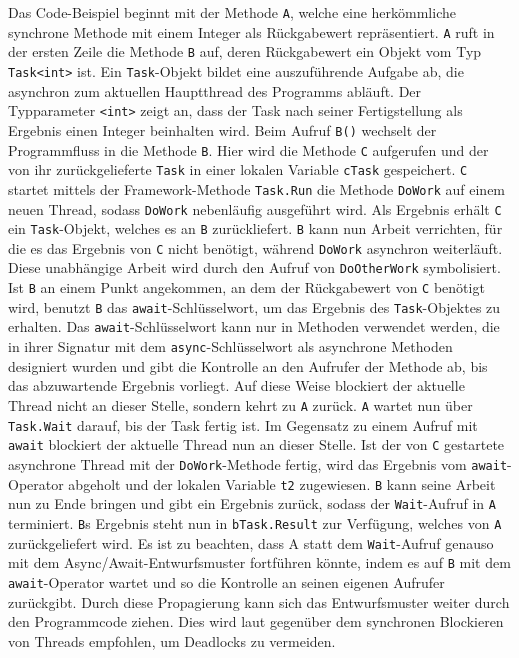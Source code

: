 \noindent
Das Code-Beispiel beginnt mit der Methode \texttt{A}, welche eine herkömmliche synchrone Methode mit einem Integer als Rückgabewert repräsentiert. \texttt{A} ruft in der ersten Zeile die Methode \texttt{B} auf, deren Rückgabewert ein Objekt vom Typ \texttt{Task<int>} ist. Ein \texttt{Task}-Objekt bildet eine auszuführende Aufgabe ab, die asynchron zum aktuellen Hauptthread des Programms abläuft. Der Typparameter \texttt{<int>} zeigt an, dass der Task nach seiner Fertigstellung als Ergebnis einen Integer beinhalten wird. Beim Aufruf \texttt{B()} wechselt der Programmfluss in die Methode \texttt{B}. Hier wird die Methode \texttt{C} aufgerufen und der von ihr zurückgelieferte \texttt{Task} in einer lokalen Variable \texttt{cTask} gespeichert. \texttt{C} startet mittels der Framework-Methode \texttt{Task.Run} die Methode \texttt{DoWork} auf einem neuen Thread, sodass \texttt{DoWork} nebenläufig ausgeführt wird. Als Ergebnis erhält \texttt{C} ein \texttt{Task}-Objekt, welches es an \texttt{B} zurückliefert. \texttt{B} kann nun Arbeit verrichten, für die es das Ergebnis von \texttt{C} nicht benötigt, während \texttt{DoWork} asynchron weiterläuft. Diese unabhängige Arbeit wird durch den Aufruf von \texttt{DoOtherWork} symbolisiert. Ist \texttt{B} an einem Punkt angekommen, an dem der Rückgabewert von \texttt{C} benötigt wird, benutzt \texttt{B} das \texttt{await}-Schlüsselwort, um das Ergebnis des \texttt{Task}-Objektes zu erhalten. Das \texttt{await}-Schlüsselwort kann nur in Methoden verwendet werden, die in ihrer Signatur mit dem \texttt{async}-Schlüsselwort als asynchrone Methoden designiert wurden und gibt die Kontrolle an den Aufrufer der Methode ab, bis das abzuwartende Ergebnis vorliegt. Auf diese Weise blockiert der aktuelle Thread nicht an dieser Stelle, sondern kehrt zu \texttt{A} zurück. \texttt{A} wartet nun über \texttt{Task.Wait} darauf, bis der Task fertig ist. Im Gegensatz zu einem Aufruf mit \texttt{await} blockiert der aktuelle Thread nun an dieser Stelle. Ist der von \texttt{C} gestartete asynchrone Thread mit der \texttt{DoWork}-Methode fertig, wird das Ergebnis vom \texttt{await}-Operator abgeholt und der lokalen Variable \texttt{t2} zugewiesen. \texttt{B} kann seine Arbeit nun zu Ende bringen und gibt ein Ergebnis zurück, sodass der \texttt{Wait}-Aufruf in \texttt{A} terminiert. \texttt{B}s Ergebnis steht nun in \texttt{bTask.Result} zur Verfügung, welches von \texttt{A} zurückgeliefert wird. 
\newline
Es ist zu beachten, dass A statt dem \texttt{Wait}-Aufruf genauso mit dem Async/Await-Entwurfsmuster fortführen könnte, indem es auf \texttt{B} mit dem \texttt{await}-Operator wartet und so die Kontrolle an seinen eigenen Aufrufer zurückgibt. Durch diese Propagierung kann sich das Entwurfsmuster weiter durch den Programmcode ziehen. Dies wird laut \cite[S. 6f]{Cleary:14} gegenüber dem synchronen Blockieren von Threads empfohlen, um Deadlocks zu vermeiden.


